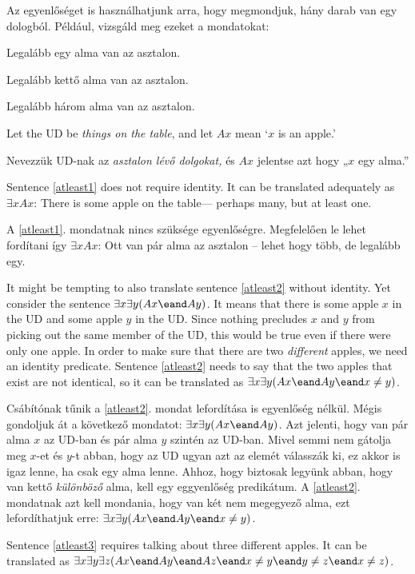 Az egyenlőséget is használhatjunk arra, hogy megmondjuk, hány darab van egy dologból. Például, vizsgáld meg ezeket a mondatokat:
\begin{earg}
\item[\ex{atleast1}] Legalább egy alma van az asztalon.
\item[\ex{atleast2}] Legalább kettő alma van az asztalon.
\item[\ex{atleast3}] Legalább három alma van az asztalon.
\end{earg}
Let the UD be \emph{things on the table}, and let $Ax$ mean `$x$ is an apple.'

Nevezzük UD-nak az \emph{asztalon lévő dolgokat,} és $Ax$ jelentse azt hogy „$x$ egy alma.”

Sentence \ref{atleast1} does not require identity. It can be translated adequately as $\exists x Ax$: There is some apple on the table--- perhaps many, but at least one.

A \ref{atleast1}. mondatnak nincs szüksége egyenlőségre. Megfelelően le lehet fordítani így $\exists x Ax$: Ott van pár alma az asztalon -- lehet hogy több, de legalább egy.

It might be tempting to also translate sentence \ref{atleast2} without identity. Yet consider the sentence $\exists x \exists y(Ax \eand Ay)$. It means that there is some apple $x$ in the UD and some apple $y$ in the UD. Since nothing precludes $x$ and $y$ from picking out the same member of the UD, this would be true even if there were only one apple. In order to make sure that there are two \emph{different} apples, we need an identity predicate. Sentence \ref{atleast2} needs to say that the two apples that exist are not identical, so it can be translated as $\exists x \exists y(Ax \eand Ay \eand x\neq y)$.

Csábítónak tűnik a \ref{atleast2}. mondat lefordítása is egyenlőség nélkül. Mégis gondoljuk át a következő mondatot: $\exists x \exists y(Ax \eand Ay)$. Azt jelenti, hogy van pár alma $x$ az UD-ban és pár alma $y$ szintén az UD-ban. Mivel semmi nem gátolja meg $x$-et és $y$-t abban, hogy az UD ugyan azt az elemét válasszák ki, ez akkor is igaz lenne, ha csak egy alma lenne. Ahhoz, hogy biztosak legyünk abban, hogy van kettő \emph{különböző} alma, kell egy eggyenlőség predikátum. A \ref{atleast2}. mondatnak azt kell mondania, hogy van két nem megegyező alma, ezt lefordíthatjuk erre: $\exists x \exists y(Ax \eand Ay \eand x\neq y)$.

Sentence \ref{atleast3} requires talking about three different apples. It can be translated as $\exists x \exists y\exists z(Ax \eand Ay \eand Az \eand x\neq y \eand y\neq z \eand x \neq z)$.


